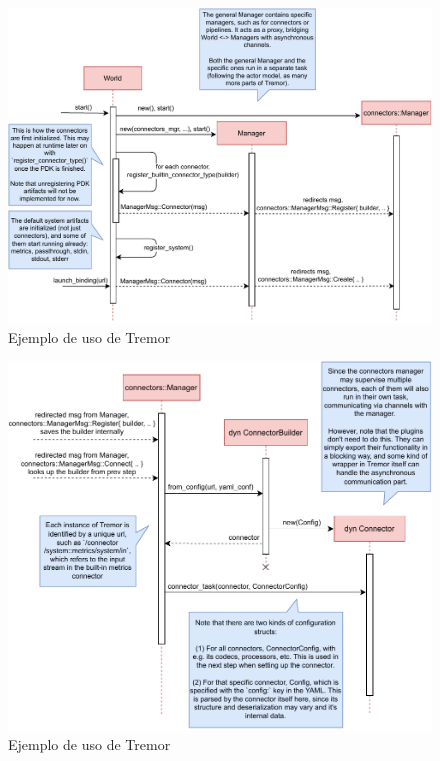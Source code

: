 \begin{figure}
    \centering
    \includegraphics[width=\textwidth]{./Imagenes/registering.pdf}
    \caption{Ejemplo de uso de Tremor}%
    \label{fig:tremor_registering}
\end{figure}

\begin{figure}
    \centering
    \includegraphics[width=\textwidth]{./Imagenes/initializing.pdf}
    \caption{Ejemplo de uso de Tremor}%
    \label{fig:tremor_initializing}
\end{figure}


